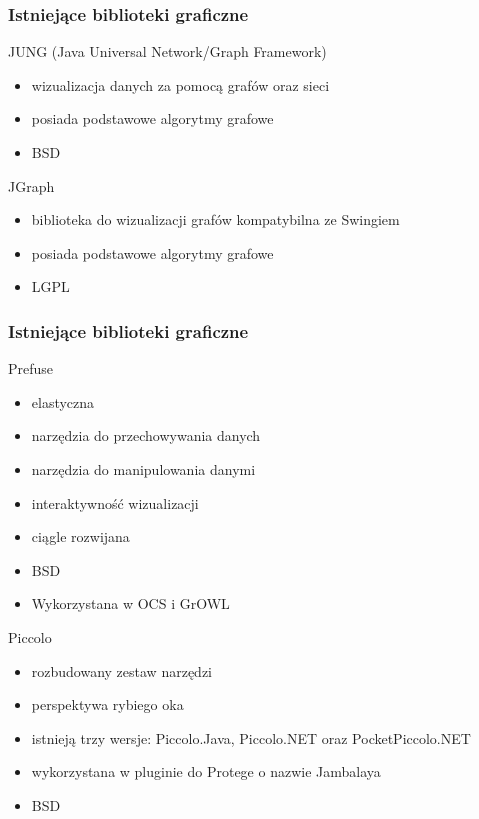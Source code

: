 \documentclass{beamer}
\begin{document}
\begin{frame}
	\frametitle{Istniejące biblioteki graficzne}
	\begin{block}{JUNG (Java Universal Network/Graph Framework)}
		\begin{itemize}
			\item	wizualizacja danych za pomocą grafów oraz sieci
			\item posiada podstawowe algorytmy grafowe
			\item BSD
	\end{itemize}
	\end{block}
	\begin{block}{JGraph}
		\begin{itemize}
			\item	 biblioteka do wizualizacji grafów kompatybilna ze Swingiem
				\item posiada podstawowe algorytmy grafowe
			\item LGPL
	\end{itemize}
	\end{block}
\end{frame}

\begin{frame}
	\frametitle{Istniejące biblioteki graficzne}
	\begin{block}{Prefuse}
		\begin{itemize}
			\item  elastyczna 
			\item narzędzia do przechowywania danych
			 \item narzędzia do manipulowania danymi 
			\item interaktywność wizualizacji 
                        \item ciągle rozwijana  
			\item BSD
			\item Wykorzystana w OCS i GrOWL     
		\end{itemize}
	\end{block}
	\begin{block}{Piccolo}
		\begin{itemize}
			\item	rozbudowany zestaw narzędzi 
			\item perspektywa rybiego oka
			\item  istnieją trzy wersje: Piccolo.Java, Piccolo.NET oraz PocketPiccolo.NET 
			\item wykorzystana w pluginie do Protege o nazwie Jambalaya
			\item BSD
	\end{itemize}
	\end{block}
\end{frame}
\end{document}
